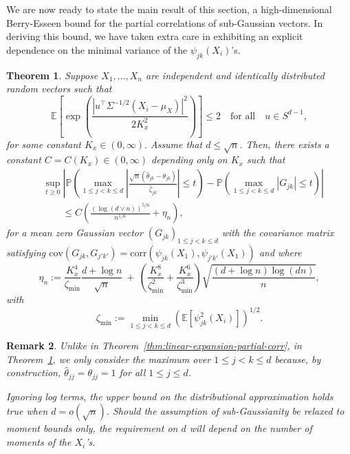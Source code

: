 \documentclass[11pt]{article}
\newtheorem{theorem}{Theorem}
\newtheorem{remark}[theorem]{Remark}
\begin{document}
We are now ready to state the main result of this section, a high-dimensional  Berry-Esseen bound for the partial correlations of sub-Gaussian vectors. In deriving this bound, we have taken extra care in exhibiting an explicit dependence on the minimal variance of the $\psi_{jk}(X_i)$'s.
\begin{theorem}\label{thm:Berry-Esseen-bound-partial-corr}
Suppose $X_1, \ldots, X_n$ are independent and identically distributed random vectors such that
\begin{equation}\label{eq:centered-subGaussian-x}
\mathbb{E}\left[\exp\left(\frac{|u^{\top}\Sigma^{-1/2}(X_i - \mu_X)|^2}{2K_x^2}\right)\right] \le 2\quad\mbox{for all}\quad u\in S^{d-1},
\end{equation}
for some constant $K_x\in(0, \infty).$ Assume that $d \leq \sqrt{n}$. Then, there exists a constant $C = C(K_x) \in(0,\infty)$ depending only on $K_x$  such that %
\begin{align*}
&\sup_{t\ge0}\left|\mathbb{P}\left(\max_{1\le j < k\le d}\left|\frac{\sqrt{n}(\widehat{\theta}_{jk} - \theta_{jk})}{\widehat{\zeta}_{jk}}\right| \le t\right) - \mathbb{P}\left(\max_{1\le j < k\le d}|G_{jk}| \le t\right)\right|\\ 
&\qquad\le C \left( \frac{(\log(d\vee n))^{5/6}}{n^{1/6}} + \eta_n \right),%
\end{align*}
for a mean zero Gaussian vector $(G_{jk})_{1\le j < k\le d}$ with the covariance matrix satisfying $\mathrm{cov}(G_{jk}, G_{j'k'}) = \mathrm{corr}(\psi_{jk}(X_1), \psi_{j'k'}(X_1))$ and where
\[
\eta_n := \frac{K_x^4}{\zeta_{\min}}\frac{d + \log n}{\sqrt{n}} ~+~ \left(\frac{K_x^8}{\zeta_{\min}^2} + \frac{K_x^6}{\zeta^3_{\min}}\right)\sqrt{\frac{(d + \log n)\log(dn)}{n}},
\]
with
\[
\zeta_{\min} := \min_{1 \leq j < k \leq d} \left(\mathbb{E}[\psi^2_{jk}(X_i)]\right)^{1/2}.
\]

\end{theorem}




\begin{remark}
Unlike in Theorem~\ref{thm:linear-expansion-partial-corr}, in Theorem~\ref{thm:Berry-Esseen-bound-partial-corr}, we only consider the maximum over $1\le j < k \le d$ because, by construction, $\widehat{\theta}_{jj} = \theta_{jj} = 1$ for all $1\le j\le d$. 

Ignoring log terms, the upper bound on the distributional approximation holds true when $d = o(\sqrt{n})$. Should the  assumption of sub-Gaussianity be relaxed to moment bounds only, the requirement on $d$ will depend on the number of moments of the $X_i$'s.
\end{remark}
\end{document}
